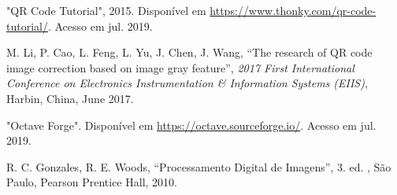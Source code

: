\documentclass{ceel}
\begin{document}
\begin{multicols}{2}
\begin{thebibliography}{9}
	"QR Code Tutorial", 2015.
	Disponível em \url{https://www.thonky.com/qr-code-tutorial/}. Acesso em jul. 2019.

  M. Li, P. Cao, L. Feng, L. Yu, J. Chen, J. Wang,
   “The research of QR code image correction based on image gray feature”,
   \emph{ 2017 First International Conference on Electronics Instrumentation \& Information Systems (EIIS)}, Harbin, China, June 2017.

"Octave Forge". 
Disponível em \url{https://octave.sourceforge.io/}. Acesso em jul. 2019.

    R. C. Gonzales, R. E. Woods,
    “Processamento Digital de Imagens”, 
    3. ed. , São Paulo, Pearson Prentice Hall, 2010.

\end{thebibliography}


\end{multicols}
\end{document}
